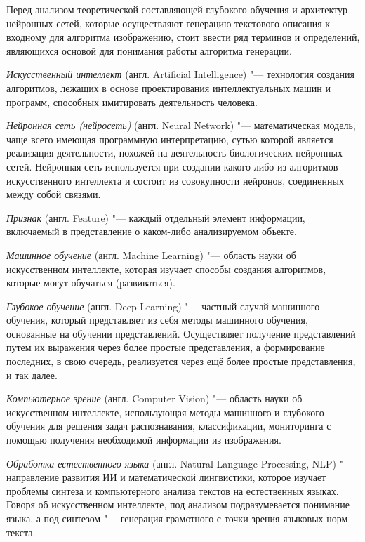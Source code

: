 \documentclass[bachelor, och, coursework]{SCWorks}
\begin{document}

    Перед анализом теоретической составляющей глубокого обучения и архитектур нейронных сетей, которые осуществляют
    генерацию текстового описания к входному для алгоритма изображению, стоит ввести ряд терминов и определений,
    являющихся основой для понимания работы алгоритма генерации.

    \textit{Искусственный интеллект} (англ. Artificial Intelligence) "--- технология создания алгоритмов, лежащих в
    основе проектирования интеллектуальных машин и программ, способных имитировать деятельность человека.

    \textit{Нейронная сеть (нейросеть)} (англ. Neural Network) "--- математическая модель, чаще всего имеющая
    программную интерпретацию, сутью которой является реализация деятельности, похожей на деятельность биологических
    нейронных сетей. Нейронная сеть используется при создании какого-либо из алгоритмов искусственного интеллекта и
    состоит из совокупности нейронов, соединенных между собой связями. 

    \textit{Признак} (англ. Feature) "--- каждый отдельный элемент информации, включаемый в представление о каком-либо
    анализируемом объекте.

    \textit{Машинное обучение} (англ. Machine Learning) "--- область науки об искусственном интеллекте, которая изучает
    способы создания алгоритмов, которые могут обучаться (развиваться).

    \textit{Глубокое обучение} (англ. Deep Learning) "--- частный случай машинного обучения, который представляет из
    себя методы машинного обучения, основанные на обучении представлений. Осуществляет получение представлений путем их
    выражения через более простые представления, а формирование последних, в свою очередь, реализуется через ещё более
    простые представления, и так далее.

    \textit{Компьютерное зрение} (англ. Computer Vision) "--- область науки об искусственном интеллекте, использующая
    методы машинного и глубокого обучения для решения задач распознавания, классификации, мониторинга с помощью
    получения необходимой информации из изображения.

    \textit{Обработка естественного языка} (англ. Natural Language Processing, NLP) "--- направление развития ИИ и
    математической лингвистики, которое изучает проблемы синтеза и компьютерного анализа текстов на естественных языках.
    Говоря об искусственном интеллекте, под анализом подразумевается понимание языка, а под синтезом "--- генерация
    грамотного с точки зрения языковых норм текста.
\end{document}
